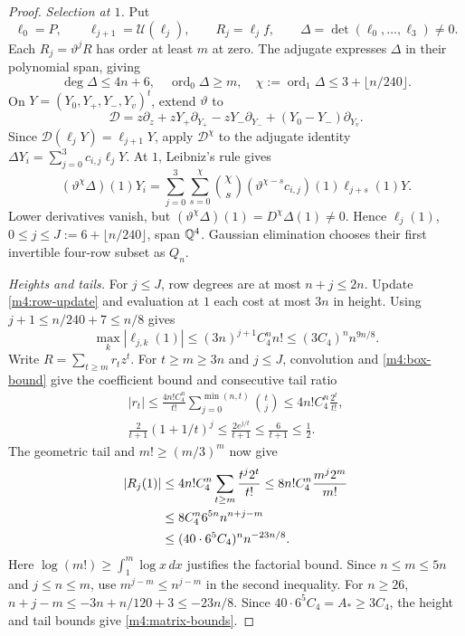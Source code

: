 \begin{proof}
\emph{Selection at $1$.}
Put
\[
 \ell_0=P,\qquad \ell_{j+1}=\mathscr U(\ell_j),\qquad R_j=\ell_jf,\qquad
 \Delta=\det(\ell_0,\ldots,\ell_3)\ne0.
\]
Each $R_j=\vartheta^jR$ has order at least $m$ at zero.
The adjugate expresses $\Delta$ in their polynomial span, giving
\begin{equation}\label{m4:determinant-orders}
 \deg\Delta\le4n+6,\quad \operatorname{ord}_0\Delta\ge m,\quad
 \chi:=\operatorname{ord}_1\Delta\le3+\lfloor n/240\rfloor.
\end{equation}
On $Y=(Y_0,Y_+,Y_-,Y_v)^t$, extend $\vartheta$ to
\[
 \mathcal D=z\partial_z+zY_+\partial_{Y_+}-zY_-\partial_{Y_-}
 +(Y_0-Y_-)\partial_{Y_v}.
\]
Since $\mathcal D(\ell_jY)=\ell_{j+1}Y$, apply $\mathcal D^\chi$
to the adjugate identity $\Delta Y_i=\sum_{j=0}^3c_{i,j}\ell_jY$.
At $1$, Leibniz's rule gives
\begin{equation}\label{m4:formal-selection}
 (\vartheta^\chi\Delta)(1)Y_i
 =\sum_{j=0}^3\sum_{s=0}^\chi\binom\chi s
 (\vartheta^{\chi-s}c_{i,j})(1)\ell_{j+s}(1)Y.
\end{equation}
Lower derivatives vanish, but $(\vartheta^\chi\Delta)(1)=D^\chi\Delta(1)\ne0$.
Hence $\ell_j(1)$, $0\le j\le J:=6+\lfloor n/240\rfloor$, span $\mathbb{Q}^4$.
Gaussian elimination chooses their first invertible four-row subset as $Q_n$.

\emph{Heights and tails.}
For $j\le J$, row degrees are at most $n+j\le2n$.
Update \eqref{m4:row-update} and evaluation at $1$ each cost at most $3n$ in height.
Using $j+1\le n/240+7\le n/8$ gives
\begin{equation}\label{m4:height}
 \max_k|\ell_{j,k}(1)|\le(3n)^{j+1}C_4^nn!
 \le(3C_4)^nn^{9n/8}.
\end{equation}
Write $R=\sum_{t\ge m}r_tz^t$.
For $t\ge m\ge3n$ and $j\le J$, convolution and \eqref{m4:box-bound}
give the coefficient bound and consecutive tail ratio
\[
\begin{gathered}
 |r_t|\le\frac{4n!C_4^n}{t!}\sum_{j=0}^{\min(n,t)}\binom tj
 \le4n!C_4^n\frac{2^t}{t!},\\
 \frac2{t+1}(1+1/t)^j\le\frac{2e^{j/t}}{t+1}
 \le\frac6{t+1}\le\frac12.
\end{gathered}
\]
The geometric tail and $m!\ge(m/3)^m$ now give
\begin{align}
 |R_j(1)|&\le4n!C_4^n\sum_{t\ge m}\frac{t^j2^t}{t!}
 \le8n!C_4^n\frac{m^j2^m}{m!}\notag\\
 &\le8C_4^n6^{5n}n^{n+j-m}\notag\\
 &\le(40\cdot6^5C_4)^nn^{-23n/8}.\label{m4:tail-final}
\end{align}
Here $\log(m!)\ge\int_1^m\log x\,dx$ justifies the factorial bound.
Since $n\le m\le5n$ and $j\le n\le m$, use $m^{j-m}\le n^{j-m}$ in the second inequality.
For $n\ge26$, $n+j-m\le-3n+n/120+3\le-23n/8$.
Since $40\cdot6^5C_4=A_*\ge3C_4$, the height and tail bounds give \eqref{m4:matrix-bounds}.
\end{proof}

